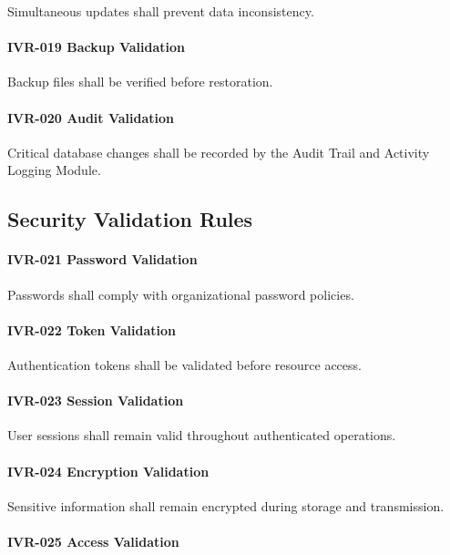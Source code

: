 Simultaneous updates shall prevent data inconsistency.

\paragraph{IVR-019 Backup Validation}

Backup files shall be verified before restoration.

\paragraph{IVR-020 Audit Validation}

Critical database changes shall be recorded by the Audit Trail and
Activity Logging Module.


\subsection{Security Validation Rules}

\paragraph{IVR-021 Password Validation}

Passwords shall comply with organizational password policies.

\paragraph{IVR-022 Token Validation}

Authentication tokens shall be validated before resource access.

\paragraph{IVR-023 Session Validation}

User sessions shall remain valid throughout authenticated operations.

\paragraph{IVR-024 Encryption Validation}

Sensitive information shall remain encrypted during storage and
transmission.

\paragraph{IVR-025 Access Validation}

